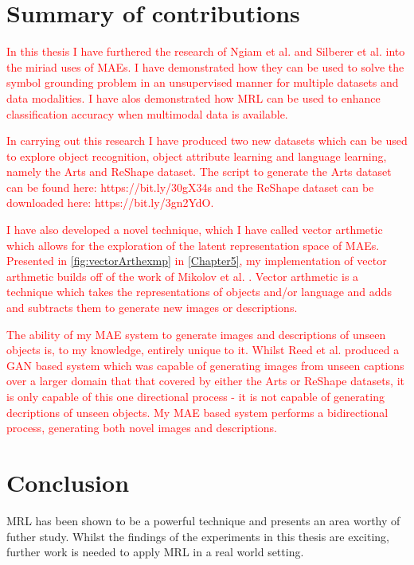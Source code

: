 \section{Summary of contributions}
\textcolor{red}{In this thesis I have furthered the research of Ngiam et al. \cite{ngiam2011multimodal} and Silberer et al. \cite{silberer2014learning} into the miriad uses of \acp{MAE}. I have demonstrated how they can be used to solve the symbol grounding problem in an unsupervised manner for multiple datasets and data modalities. I have alos demonstrated how \ac{MRL} can be used to enhance classification accuracy when multimodal data is available.}

\textcolor{red}{In carrying out this research I have produced two new datasets which can be used to explore object recognition, object attribute learning and language learning, namely the Arts and ReShape dataset. The script to generate the Arts dataset can be found here: https://bit.ly/30gX34s and the ReShape dataset can be downloaded here: https://bit.ly/3gn2YdO.}

\textcolor{red}{I have also developed a novel technique, which I have called vector arthmetic which allows for the exploration of the latent representation space of \acp{MAE}. Presented in \autoref{fig:vectorArthexmp} in \autoref{Chapter5}, my implementation of vector arthmetic builds off of the work of Mikolov et al. \cite{mikolov2013distributed, mikolov2013efficient, mikolov2013linguistic}. Vector arthmetic is a technique which takes the representations of objects and/or language and adds and subtracts them to generate new images or descriptions.} 

\textcolor{red}{The ability of my \ac{MAE} system to generate images and descriptions of unseen objects is, to my knowledge, entirely unique to it. Whilst Reed et al. \cite{reed2016generative} produced a GAN based system which was capable of generating images from unseen captions over a larger domain that that covered by either the Arts or ReShape datasets, it is only capable of this one directional process - it is not capable of generating decriptions of unseen objects. My \ac{MAE} based system performs a bidirectional process, generating both novel images and descriptions.}

\section{Conclusion}
\ac{MRL} has been shown to be a powerful technique and presents an area worthy of futher study. Whilst the findings of the experiments in this thesis are exciting, further work is needed to apply \ac{MRL} in a real world setting.

